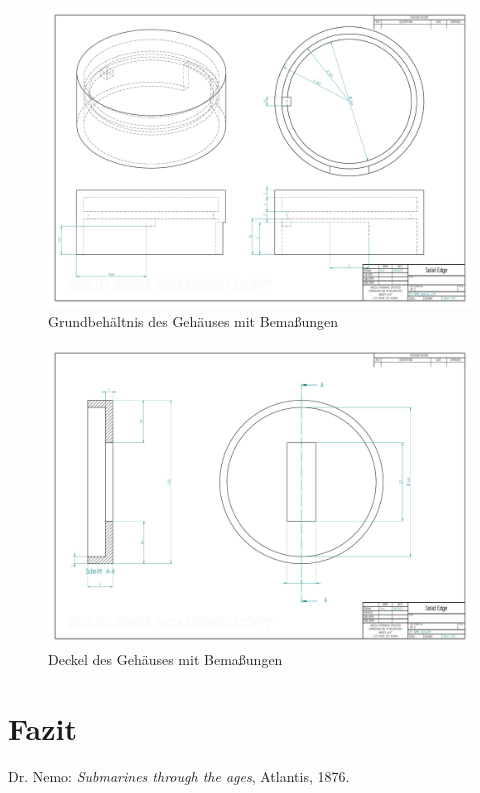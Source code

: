 \documentclass[a4paper,
DIV=13,
12pt,
BCOR=10mm,
department=FakEI,
parskip=half,
automark,
]{article}
\begin{document}
\begin{figure}[!hbpt]
 \begin{center} \includegraphics[width=1.4\textwidth,angle=-90]{gehauuse_4.pdf}
 \caption{Grundbehältnis des Gehäuses mit Bemaßungen}
 \label{fig:Register}
  \end{center}
\end{figure}

\begin{figure}[!hbpt]
 \begin{center} \includegraphics[width=1.4\textwidth,angle=-90]{Deckel.pdf}
 \caption{Deckel des Gehäuses mit Bemaßungen}
 \label{fig:Deckel}
  \end{center}
\end{figure}


\section{Fazit}








\cleardoublepage
\begin{appendix}
\listoffigures

\cleardoublepage
\begin{thebibliography}{99}
 Dr. Nemo: \textit{Submarines through the ages}, Atlantis, 1876.
\end{thebibliography}

\cleardoublepage

\end{appendix}
\end{document}
